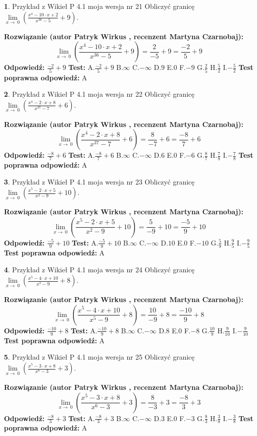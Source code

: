 \documentclass[12pt, a4paper]{article}
\theoremstyle{definition} %
\newtheorem{zad}{}
\newcommand{\zadStart}[1]{\begin{zad}#1\newline}
\newcommand{\zadStop}{\end{zad}}
\newcommand{\rozwStart}[2]{\noindent \textbf{Rozwiązanie (autor #1 , recenzent #2): }\newline}
\newcommand{\rozwStop}{\newline}
\newcommand{\odpStart}{\noindent \textbf{Odpowiedź:}\newline}
\newcommand{\odpStop}{\newline}
\newcommand{\testStart}{\noindent \textbf{Test:}\newline}
\newcommand{\testStop}{\newline}
\newcommand{\kluczStart}{\noindent \textbf{Test poprawna odpowiedź:}\newline}
\newcommand{\kluczStop}{\newline}
\begin{document}
\zadStart{Przykład z Wikieł P 4.1 moja wersja nr 21}
Obliczyć granicę $\lim\limits_{x\to\ 0}(\frac{x^{4}-10 \cdot x +2}{x^{36}-5}+9)$.
\zadStop
\rozwStart{Patryk Wirkus}{Martyna Czarnobaj}
$$\lim\limits_{x\to\ 0}(\frac{x^{4}-10 \cdot x +2}{x^{36}-5}+9)=\frac{2}{-5}+9=\frac{-2}{5}+9$$
\rozwStop
\odpStart
$\frac{-2}{5}+9$
\odpStop
\testStart
A.$\frac{-2}{5}+9$
B.$\infty$
C.$-\infty$
D.$9$
E.$0$
F.$-9$
G.$\frac{2}{5}$
H.$\frac{5}{2}$
I.$-\frac{5}{2}$
\testStop
\kluczStart
A
\kluczStop



\zadStart{Przykład z Wikieł P 4.1 moja wersja nr 22}
Obliczyć granicę $\lim\limits_{x\to\ 0}(\frac{x^{4}-2 \cdot x +8}{x^{37}-7}+6)$.
\zadStop
\rozwStart{Patryk Wirkus}{Martyna Czarnobaj}
$$\lim\limits_{x\to\ 0}(\frac{x^{4}-2 \cdot x +8}{x^{37}-7}+6)=\frac{8}{-7}+6=\frac{-8}{7}+6$$
\rozwStop
\odpStart
$\frac{-8}{7}+6$
\odpStop
\testStart
A.$\frac{-8}{7}+6$
B.$\infty$
C.$-\infty$
D.$6$
E.$0$
F.$-6$
G.$\frac{8}{7}$
H.$\frac{7}{8}$
I.$-\frac{7}{8}$
\testStop
\kluczStart
A
\kluczStop



\zadStart{Przykład z Wikieł P 4.1 moja wersja nr 23}
Obliczyć granicę $\lim\limits_{x\to\ 0}(\frac{x^{5}-2 \cdot x +5}{x^{2}-9}+10)$.
\zadStop
\rozwStart{Patryk Wirkus}{Martyna Czarnobaj}
$$\lim\limits_{x\to\ 0}(\frac{x^{5}-2 \cdot x +5}{x^{2}-9}+10)=\frac{5}{-9}+10=\frac{-5}{9}+10$$
\rozwStop
\odpStart
$\frac{-5}{9}+10$
\odpStop
\testStart
A.$\frac{-5}{9}+10$
B.$\infty$
C.$-\infty$
D.$10$
E.$0$
F.$-10$
G.$\frac{5}{9}$
H.$\frac{9}{5}$
I.$-\frac{9}{5}$
\testStop
\kluczStart
A
\kluczStop



\zadStart{Przykład z Wikieł P 4.1 moja wersja nr 24}
Obliczyć granicę $\lim\limits_{x\to\ 0}(\frac{x^{5}-4 \cdot x +10}{x^{5}-9}+8)$.
\zadStop
\rozwStart{Patryk Wirkus}{Martyna Czarnobaj}
$$\lim\limits_{x\to\ 0}(\frac{x^{5}-4 \cdot x +10}{x^{5}-9}+8)=\frac{10}{-9}+8=\frac{-10}{9}+8$$
\rozwStop
\odpStart
$\frac{-10}{9}+8$
\odpStop
\testStart
A.$\frac{-10}{9}+8$
B.$\infty$
C.$-\infty$
D.$8$
E.$0$
F.$-8$
G.$\frac{10}{9}$
H.$\frac{9}{10}$
I.$-\frac{9}{10}$
\testStop
\kluczStart
A
\kluczStop



\zadStart{Przykład z Wikieł P 4.1 moja wersja nr 25}
Obliczyć granicę $\lim\limits_{x\to\ 0}(\frac{x^{5}-3 \cdot x +8}{x^{6}-3}+3)$.
\zadStop
\rozwStart{Patryk Wirkus}{Martyna Czarnobaj}
$$\lim\limits_{x\to\ 0}(\frac{x^{5}-3 \cdot x +8}{x^{6}-3}+3)=\frac{8}{-3}+3=\frac{-8}{3}+3$$
\rozwStop
\odpStart
$\frac{-8}{3}+3$
\odpStop
\testStart
A.$\frac{-8}{3}+3$
B.$\infty$
C.$-\infty$
D.$3$
E.$0$
F.$-3$
G.$\frac{8}{3}$
H.$\frac{3}{8}$
I.$-\frac{3}{8}$
\testStop
\kluczStart
A
\kluczStop
\end{document}
